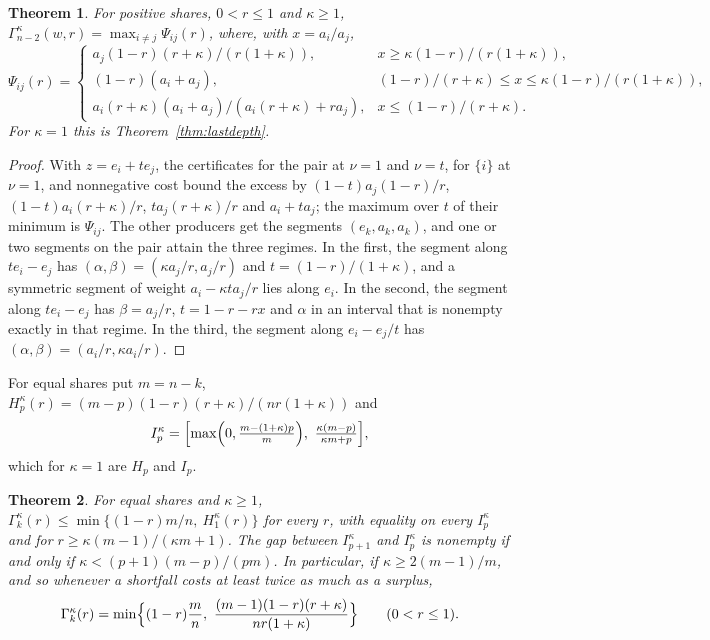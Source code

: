 \documentclass[11pt,a4paper]{article}
\newtheorem{theorem}{Theorem}
\theoremstyle{remark}
\begin{document}
\begin{theorem}\label{thm:asymlast}
For positive shares, $0<r\le1$ and $\kappa\ge1$,
$\Gamma_{n-2}^\kappa(w,r)=\max_{i\ne j}\Psi_{ij}(r)$, where, with $x=a_i/a_j$,
\[
\Psi_{ij}(r)=
\begin{cases}
a_j(1-r)(r+\kappa)/(r(1+\kappa)), & x\ge\kappa(1-r)/(r(1+\kappa)),\\
(1-r)(a_i+a_j), & (1-r)/(r+\kappa)\le x\le\kappa(1-r)/(r(1+\kappa)),\\
a_i(r+\kappa)(a_i+a_j)/(a_i(r+\kappa)+ra_j), & x\le(1-r)/(r+\kappa).
\end{cases}
\]
For $\kappa=1$ this is Theorem~\ref{thm:lastdepth}.
\end{theorem}

\begin{proof}
With $z=e_i+te_j$, the certificates for the pair at $\nu=1$ and $\nu=t$, for
$\{i\}$ at $\nu=1$, and nonnegative cost bound the excess by
$(1-t)a_j(1-r)/r$, $(1-t)a_i(r+\kappa)/r$, $ta_j(r+\kappa)/r$ and $a_i+ta_j$;
the maximum over $t$ of their minimum is $\Psi_{ij}$. The other producers get
the segments $(e_k,a_k,a_k)$, and one or two segments on the pair attain the
three regimes. In the first, the segment along $te_i-e_j$ has
$(\alpha,\beta)=(\kappa a_j/r,a_j/r)$ and $t=(1-r)/(1+\kappa)$, and a
symmetric segment of weight $a_i-\kappa ta_j/r$ lies along $e_i$. In the
second, the segment along $te_i-e_j$ has $\beta=a_j/r$, $t=1-r-rx$ and
$\alpha$ in an interval that is nonempty exactly in that regime. In the
third, the segment along $e_i-e_j/t$ has $(\alpha,\beta)=(a_i/r,\kappa a_i/r)$.
\end{proof}

For equal shares put $m=n-k$,
$H_p^\kappa(r)=(m-p)(1-r)(r+\kappa)/(nr(1+\kappa))$ and
\[
I_p^\kappa=\Bigl[\max\Bigl(0,\tfrac{m-(1+\kappa)p}{m}\Bigr),\
\tfrac{\kappa(m-p)}{\kappa m+p}\Bigr],
\]
which for $\kappa=1$ are $H_p$ and $I_p$.

\begin{theorem}\label{thm:asymequal}
For equal shares and $\kappa\ge1$,
$\Gamma_k^\kappa(r)\le\min\{(1-r)m/n,\ H_1^\kappa(r)\}$ for every $r$, with
equality on every $I_p^\kappa$ and for $r\ge\kappa(m-1)/(\kappa m+1)$. The gap
between $I_{p+1}^\kappa$ and $I_p^\kappa$ is nonempty if and only if
$\kappa<(p+1)(m-p)/(pm)$. In particular, if $\kappa\ge2(m-1)/m$, and so
whenever a shortfall costs at least twice as much as a surplus,
\[
\Gamma_k^\kappa(r)=\min\Bigl\{(1-r)\frac mn,\
\frac{(m-1)(1-r)(r+\kappa)}{nr(1+\kappa)}\Bigr\}\qquad(0<r\le1).
\]
\end{theorem}
\end{document}
